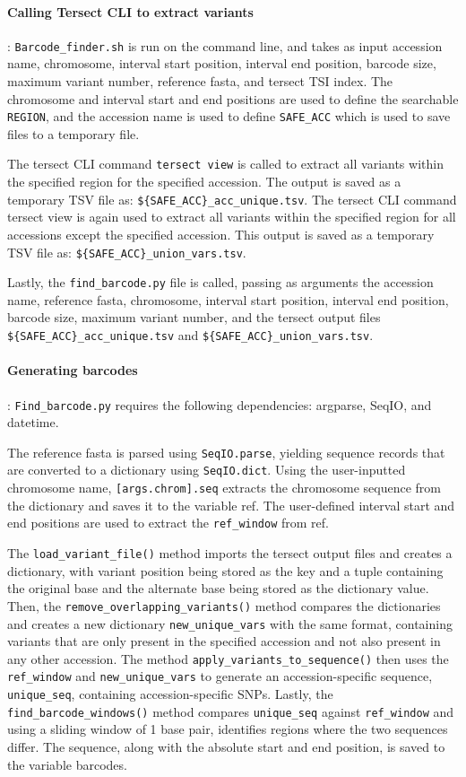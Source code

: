 \documentclass[12pt]{article}
\begin{document}
\paragraph{Calling Tersect CLI to extract variants}: 
\verb+Barcode_finder.sh+ is run on the command line, and takes as input accession name, chromosome, interval start position, interval end position, barcode size, maximum variant number, reference fasta, and tersect TSI index. The chromosome and interval start and end positions are used to define the searchable \verb+REGION+, and the accession name is used to define \verb+SAFE_ACC+ which is used to save files to a temporary file.  

The tersect CLI command \verb+tersect view+  is called to extract all variants within the specified region for the specified accession. The output is saved as a temporary TSV file as: \verb+${SAFE_ACC}_acc_unique.tsv+. The tersect CLI command tersect view is again used to extract all variants within the specified region for all accessions except the specified accession. This output is saved as a temporary TSV file as: \verb+${SAFE_ACC}_union_vars.tsv+.  

Lastly, the \verb+find_barcode.py+ file is called, passing as arguments the accession name, reference fasta, chromosome, interval start position, interval end position, barcode size, maximum variant number, and the tersect output files  \verb+${SAFE_ACC}_acc_unique.tsv+ and  \verb+${SAFE_ACC}_union_vars.tsv+. 

\paragraph{Generating barcodes}: 
\verb+Find_barcode.py+ requires the following dependencies: argparse, SeqIO, and datetime.  

The reference fasta is parsed using \verb+SeqIO.parse+, yielding sequence records that are converted to a dictionary using \verb+SeqIO.dict+. Using the user-inputted chromosome name, \verb+[args.chrom].seq+ extracts the chromosome sequence from the dictionary and saves it to the variable ref. The user-defined interval start and end positions are used to extract the \verb+ref_window+ from ref. 

The \verb+load_variant_file()+ method imports the tersect output files and creates a dictionary, with variant position being stored as the key and a tuple containing the original base and the alternate base being stored as the dictionary value. Then, the \verb+remove_overlapping_variants()+ method compares the dictionaries and creates a new dictionary \verb+new_unique_vars+ with the same format, containing variants that are only present in the specified accession and not also present in any other accession. The method \verb+apply_variants_to_sequence()+ then uses the \verb+ref_window+ and \verb+new_unique_vars+ to generate an accession-specific sequence, \verb+unique_seq+, containing accession-specific SNPs. Lastly, the \verb+find_barcode_windows()+ method compares \verb+unique_seq+ against \verb+ref_window+ and using a sliding window of 1 base pair, identifies regions where the two sequences differ. The sequence, along with the absolute start and end position, is saved to the variable barcodes.  
\end{document}
